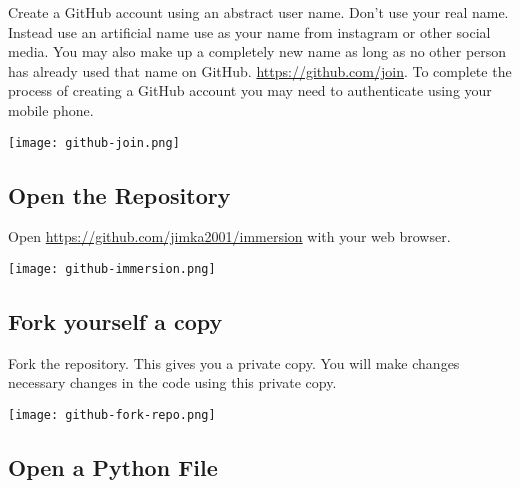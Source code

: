 Create a GitHub account using an abstract user name.  Don't use your
real name.  Instead use an artificial name use as your name from
instagram or other social media.  You may also make up a completely
new name as long as no other person has already used that name on
GitHub.  \url{https://github.com/join}.  To complete the process of
creating a GitHub account you may need to authenticate using your
mobile phone.


\noindent\texttt{[image: github-join.png]}



\subsection{Open the Repository}
  
Open \url{https://github.com/jimka2001/immersion} with your web browser.

\noindent\texttt{[image: github-immersion.png]}


\subsection{Fork yourself a copy}

Fork the repository.  This gives you a private copy.  You will make changes
necessary changes in the code using this private copy.

\noindent \texttt{[image: github-fork-repo.png]}



\subsection{Open a Python File}
  
